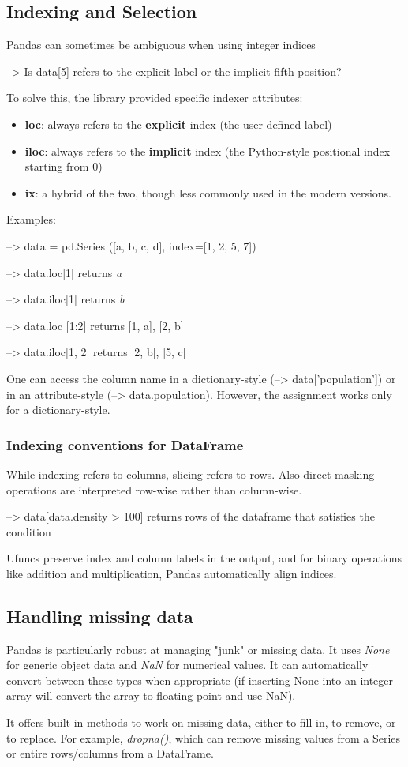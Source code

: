 \subsection{Indexing and Selection}
Pandas can sometimes be ambiguous when using integer indices \par
--> Is data[5] refers to the explicit label or the implicit fifth position?\par
To solve this, the library provided specific indexer attributes:
\begin{itemize}[noitemsep]
    \item \textbf{loc}: always refers to the \textbf{explicit} index (the user-defined label)
    \item \textbf{iloc}: always refers to the \textbf{implicit} index (the Python-style positional index starting from 0)
    \item \textbf{ix}: a hybrid of the two, though less commonly used in the modern versions.
\end{itemize}
Examples: \par
--> data = pd.Series ([a, b, c, d], index=[1, 2, 5, 7])\par
--> data.loc[1] returns \textit{a}\par
--> data.iloc[1] returns \textit{b} \par
--> data.loc [1:2] returns {[1, a], [2, b]} \par
--> data.iloc[1, 2] returns {[2, b], [5, c]} \par
One can access the column name in a dictionary-style (--> data['population']) or in an attribute-style (--> data.population). However, the assignment works only for a dictionary-style.

\subsubsection{Indexing conventions for DataFrame}
While indexing refers to columns, slicing refers to rows. Also direct masking operations are interpreted row-wise rather than column-wise.\par
--> data[data.density > 100] returns rows of the dataframe that satisfies the condition\par
Ufuncs preserve index and column labels in the output, and for binary operations like addition and multiplication, Pandas automatically align indices.

\subsection{Handling missing data}
Pandas is particularly robust at managing "junk" or missing data. It uses \textit{None} for generic object data and \textit{NaN} for numerical values. It can automatically convert between these types when appropriate (if inserting None into an integer array will convert the array to floating-point and use NaN). \par
It offers built-in methods to work on missing data, either to fill in, to remove, or to replace. For example, \textit{dropna()}, which can remove missing values from a Series or entire rows/columns from a DataFrame.

